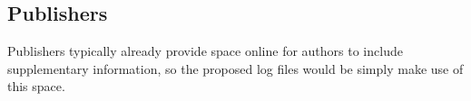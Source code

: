 \subsection{Publishers}

Publishers typically already provide space online for authors to include supplementary information, so the proposed log files would be simply make use of this space. 